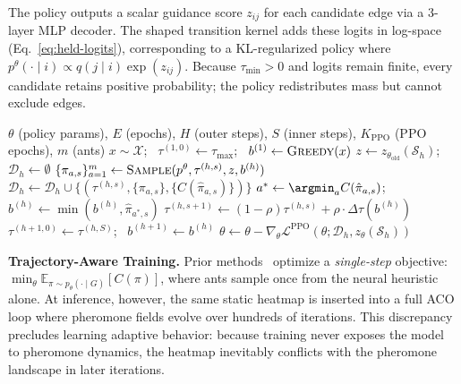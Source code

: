 \documentclass[sigconf,review]{acmart}
\newcommand{\DyNACO}{\textsc{DyNACO}}
\begin{document}
The policy outputs a scalar guidance score $z_{ij}$ for each candidate edge via a 3-layer MLP decoder.
The shaped transition kernel adds these logits in log-space (Eq.~\ref{eq:held-logits}), corresponding to a KL-regularized policy where $p^\theta(\cdot\mid i) \propto q(j\mid i)\exp(z_{ij})$.
Because $\tau_{\min} > 0$ and logits remain finite, every candidate retains positive probability; the policy redistributes mass but cannot exclude edges.
\begin{algorithm}[t]
\caption{PPO training for \DyNACO{}.}
\label{alg:train}
\begin{algorithmic}[1]
\REQUIRE $\theta$ (policy params), $E$ (epochs), $H$ (outer steps), $S$ (inner steps), $K_{\text{PPO}}$ (PPO epochs), $m$ (ants)
    \STATE $x \sim \mathcal{X}$; \, $\tau^{(1,0)} \gets \tau_{\max}$; \, $b^{(1)} \gets \textsc{Greedy}(x)$
        \STATE $z \gets z_{\theta_{\text{old}}}(\mathcal{S}_h)$; \, $\mathcal{D}_h \gets \emptyset$
            \STATE $\{\pi_{a,s}\}_{a=1}^m \gets \textsc{Sample}(p^\theta, \tau^{(h,s)}, z, b^{(h)})$
            \STATE $\mathcal{D}_h \gets \mathcal{D}_h \cup \{(\tau^{(h,s)}, \{\pi_{a,s}\}, \{C(\hat{\pi}_{a,s})\})\}$
            \STATE $a^* \gets \argmin_a C(\hat{\pi}_{a,s})$; \, $b^{(h)} \gets \min(b^{(h)}, \hat{\pi}_{a^*,s})$
            \STATE $\tau^{(h,s+1)} \gets (1{-}\rho)\tau^{(h,s)} + \rho \cdot \Delta\tau(b^{(h)})$
        \ENDFOR
        \STATE $\tau^{(h+1,0)} \gets \tau^{(h,S)}$; \, $b^{(h+1)} \gets b^{(h)}$
            \STATE $\theta \gets \theta - \nabla_\theta \mathcal{L}^{\text{PPO}}(\theta; \mathcal{D}_h, z_\theta(\mathcal{S}_h))$
        \ENDFOR
    \ENDFOR
\ENDFOR
\end{algorithmic}
\end{algorithm}



\smallskip\noindent\textbf{Trajectory-Aware Training.}
\label{sec:training}
Prior methods~\cite{deepaco,gfacs,gtgaco} optimize a \emph{single-step} objective: $\min_\theta \mathbb{E}_{\pi \sim p_\theta(\cdot \mid G)} [ C(\pi) ]$, where ants sample once from the neural heuristic alone.
At inference, however, the same static heatmap is inserted into a full ACO loop where pheromone fields evolve over hundreds of iterations.
This discrepancy precludes learning adaptive behavior: because training never exposes the model to pheromone dynamics, the heatmap inevitably conflicts with the pheromone landscape in later iterations.
\end{document}
